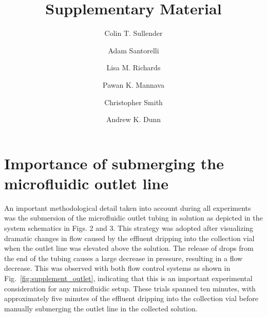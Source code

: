 \documentclass{article}
\title{Supplementary Material}
\author[a]{Colin T. Sullender}
\author[a]{Adam Santorelli}
\author[a]{Lisa M. Richards}
\author[a]{Pawan K. Mannava}
\author[a]{Christopher Smith}
\author[a,*]{Andrew K. Dunn}
\affil[a]{Department of Biomedical Engineering, The University of Texas at Austin, Austin, TX, 78712, USA}
\date{}
\begin{document}
\maketitle

\section{Importance of submerging the microfluidic outlet line}

An important methodological detail taken into account during all experiments was the submersion of the microfluidic outlet tubing in solution as depicted in the system schematics in Figs. 2 and 3. This strategy was adopted after visualizing dramatic changes in flow caused by the effluent dripping into the collection vial when the outlet line was elevated above the solution. The release of drops from the end of the tubing causes a large decrease in pressure, resulting in a flow decrease. This was observed with both flow control systems as shown in Fig.~\ref{fig:supplement_outlet}, indicating that this is an important experimental consideration for any microfluidic setup. These trials spanned ten minutes, with approximately five minutes of the effluent dripping into the collection vial before manually submerging the outlet line in the collected solution.
\end{document}
